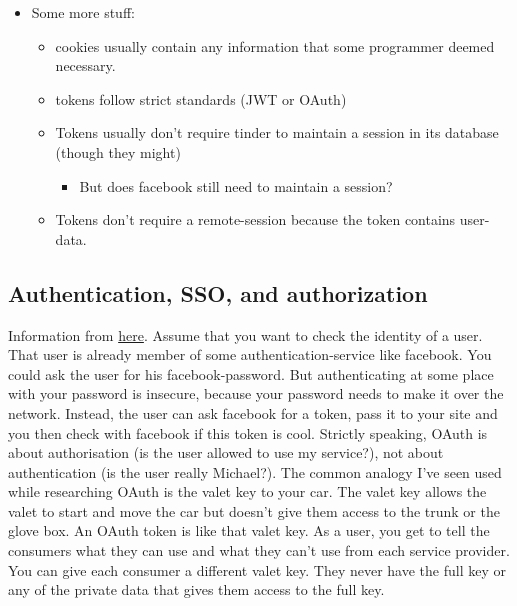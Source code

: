 \begin{itemize}
     \item Some more stuff: \begin{itemize}
          \item cookies usually contain any information that some programmer deemed necessary.
          \item tokens follow strict standards (JWT or OAuth)
          \item Tokens usually don't require tinder to maintain a session in its database (though they might) \begin{itemize}
               \item But does facebook still need to maintain a session?
          \end{itemize}
          \item Tokens don't require a remote-session because the token contains user-data. 
     \end{itemize}
          
\end{itemize}

\subsection{Authentication, SSO, and authorization}
Information from \href{https://www.varonis.com/blog/what-is-oauth/}{here}.
Assume that you want to check the identity of a user. That user is already member of some authentication-service like facebook. You could ask the user for his facebook-password. But authenticating at some place with your password is insecure, because your password needs to make it over the network. Instead, the user can ask facebook for a token, pass it to your site and you then check with facebook if this token is cool. 
Strictly speaking, OAuth is about authorisation (is the user allowed to use my service?), not about authentication (is the user really Michael?). The common analogy I’ve seen used while researching OAuth is the valet key to your car. The valet key allows the valet to start and move the car but doesn’t give them access to the trunk or the glove box. An OAuth token is like that valet key. As a user, you get to tell the consumers what they can use and what they can’t use from each service provider. You can give each consumer a different valet key. They never have the full key or any of the private data that gives them access to the full key.
           
           

